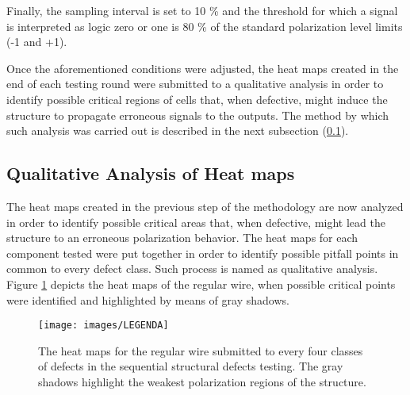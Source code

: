 Finally, the sampling interval is set to 10 \% and the threshold for which a signal is interpreted as logic zero or one is 80 \% of the standard polarization level limits (-1 and +1).

Once the aforementioned conditions were adjusted, the heat maps created in the end of each testing round were submitted to a qualitative analysis in order to identify possible critical regions of cells that, when defective, might induce the structure to propagate erroneous signals to the outputs. The method by which such analysis was carried out is described in the next subsection (\ref{Qualitative_Analysis_of_Heat_maps}).

\subsection{Qualitative Analysis of Heat maps}
\label{Qualitative_Analysis_of_Heat_maps}

The heat maps created in the previous step of the methodology are now analyzed in order to identify possible critical areas that, when defective, might lead the structure to an erroneous polarization behavior. The heat maps for each component tested were put together in order to identify possible pitfall points in common to every defect class. Such process is named as qualitative analysis. Figure \ref{figure:reg_wire_uniform} depicts the heat maps of the regular wire, when possible critical points were identified and highlighted by means of gray shadows.

\begin{figure}[!ht]
\center
{}
\hfill
{}
\hfill
{}
\hfill
{}
\linebreak
{\texttt{[image: images/LEGENDA]}
}
\caption{The heat maps for the regular wire submitted to every four classes of defects in the sequential structural defects testing. The gray shadows highlight the weakest polarization regions of the structure. }
\label{figure:reg_wire_uniform}
\end{figure}

